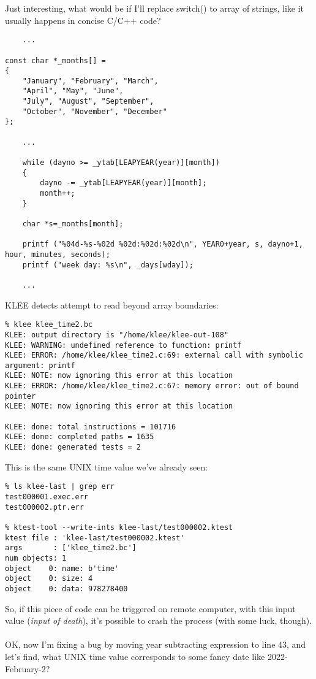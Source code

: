 Just interesting, what would be if I'll replace switch() to array of strings, like it usually happens in concise C/C++ code?

\begin{lstlisting}
	...

const char *_months[] =
{
	"January", "February", "March",
	"April", "May", "June",
	"July", "August", "September",
	"October", "November", "December"
};

	...

	while (dayno >= _ytab[LEAPYEAR(year)][month])
	{
		dayno -= _ytab[LEAPYEAR(year)][month];
		month++;
	}
	
	char *s=_months[month];

	printf ("%04d-%s-%02d %02d:%02d:%02d\n", YEAR0+year, s, dayno+1, hour, minutes, seconds);
	printf ("week day: %s\n", _days[wday]);	
	
	...

\end{lstlisting}

KLEE detects attempt to read beyond array boundaries:

\begin{lstlisting}
% klee klee_time2.bc
KLEE: output directory is "/home/klee/klee-out-108"
KLEE: WARNING: undefined reference to function: printf
KLEE: ERROR: /home/klee/klee_time2.c:69: external call with symbolic argument: printf
KLEE: NOTE: now ignoring this error at this location
KLEE: ERROR: /home/klee/klee_time2.c:67: memory error: out of bound pointer
KLEE: NOTE: now ignoring this error at this location

KLEE: done: total instructions = 101716
KLEE: done: completed paths = 1635
KLEE: done: generated tests = 2
\end{lstlisting}

This is the same UNIX time value we've already seen:

\begin{lstlisting}
% ls klee-last | grep err
test000001.exec.err
test000002.ptr.err

% ktest-tool --write-ints klee-last/test000002.ktest
ktest file : 'klee-last/test000002.ktest'
args       : ['klee_time2.bc']
num objects: 1
object    0: name: b'time'
object    0: size: 4
object    0: data: 978278400
\end{lstlisting}

So, if this piece of code can be triggered on remote computer, with this input value (\textit{input of death}),
it's possible to crash the process (with some luck, though).\\
\\
OK, now I'm fixing a bug by moving year subtracting expression to line 43, and let's find, what UNIX time value corresponds to some fancy date
like 2022-February-2?

